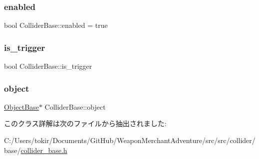 \mbox{\label{class_collider_base_a812053f247dc6357357bdf9353dded77}} 
\subsubsection{\texorpdfstring{enabled}{enabled}}
{\footnotesize\ttfamily bool Collider\+Base\+::enabled = true}

\mbox{\label{class_collider_base_a8e2383d9422880103aa5309a6dfcef48}} 
\subsubsection{\texorpdfstring{is\+\_\+trigger}{is\_trigger}}
{\footnotesize\ttfamily bool Collider\+Base\+::is\+\_\+trigger}

\mbox{\label{class_collider_base_a63adac6a75877857abe9ff2cf4274157}} 
\subsubsection{\texorpdfstring{object}{object}}
{\footnotesize\ttfamily \mbox{\hyperlink{class_object_base}{Object\+Base}}$\ast$ Collider\+Base\+::object}



このクラス詳解は次のファイルから抽出されました\+:\begin{DoxyCompactItemize}
\item 
C\+:/\+Users/tokir/\+Documents/\+Git\+Hub/\+Weapon\+Merchant\+Adventure/src/src/collider/base/\mbox{\hyperlink{collider__base_8h}{collider\+\_\+base.\+h}}\end{DoxyCompactItemize}
